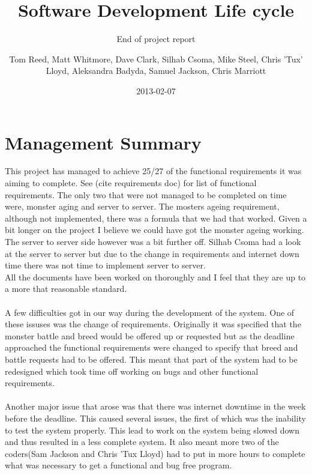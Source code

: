 \documentclass{project}
\begin{document}
\title{Software Development Life cycle}
\subtitle{End of project report}
\author{Tom Reed, Matt Whitmore, Dave Clark, Silhab Csoma, Mike Steel, Chris 'Tux' Lloyd, Aleksandra Badyda, Samuel Jackson, Chris Marriott}
\date{2013-02-07}
\maketitle
\tableofcontents
\newpage



\section{Management Summary}
This project has managed to achieve 25/27 of the functional requirements it was aiming to complete. See (cite requirements doc) for list of functional requirements. The only two that were not managed to be completed on time were, monster aging and server to server. The mosters ageing requirement, although not implemented, there was a formula that we had that worked. Given a bit longer on the project I believe we could have got the monster ageing working. The server to server side however was a bit further off. Silhab Csoma had a look at the server to server but due to the change in requirements and internet down time there was not time to implement server to server.
\\
All the documents have been worked on thoroughly and I feel that they are up to a more that reasonable standard.
\\
\\
A few difficulties got in our way during the development of the system. One of these issuses was the change of requirements. Originally it was specified that the monster battle and breed would be offered up or requested but as the deadline approached the functional requirements were changed to specify that breed and battle requests had to be offered. This meant that part of the system had to be redesigned which took time off working on bugs and other functional requirements. 
\\
\\
Another major issue that arose was that there was internet downtime in the week before the deadline. This caused several issues, the first of which was the inability to test the system properly. This lead to work on the system being slowed down and thus resulted in a less complete system. It also meant more two of the coders(Sam Jackson and Chris 'Tux Lloyd) had to put in more hours to complete what was necessary to get a functional and bug free program. 
\end{document}
